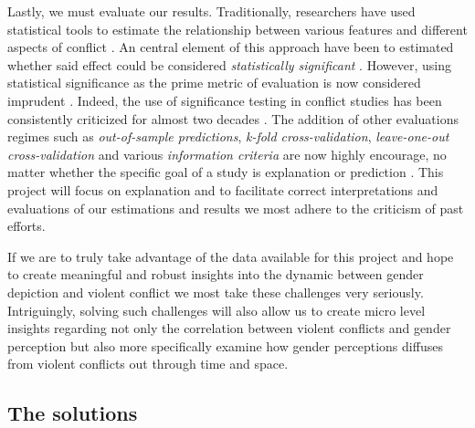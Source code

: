 \documentclass[a4paper]{article}
\begin{document}
Lastly, we must evaluate our results. Traditionally, researchers have used statistical tools to estimate the relationship between various features and different aspects of conflict \citep[8]{chadefaux2017conflict}. An central element of this approach have been to estimated whether said effect could be considered \emph{statistically significant} \citep[363-364]{Ward_Greenhill_Bakke_2010}. However, using statistical significance as the prime metric of evaluation is now considered imprudent \citep{Ward_Greenhill_Bakke_2010, Schrodt_2014, chadefaux2017conflict}. Indeed, the use of significance testing in conflict studies has been consistently criticized for almost two decades \citep{king_zeng_2001b, Ward_Greenhill_Bakke_2010, Goldstone_2010, Schrodt_2014, chadefaux2017conflict}. The addition of other evaluations regimes such as \emph{out-of-sample predictions}, \emph{k-fold cross-validation}, \emph{leave-one-out cross-validation} and various \emph{information criteria} are now highly encourage, no matter whether the specific goal of a study is explanation or prediction \citep{Ward_Greenhill_Bakke_2010, Schrodt_2014, Mcelreath_2018}. This project will focus on explanation and to facilitate correct interpretations and evaluations of our estimations and results we most adhere to the criticism of past efforts.\par 

If we are to truly take advantage of the data available for this project and hope to create meaningful and robust insights into the dynamic between gender depiction and violent conflict we most take these challenges very seriously. Intriguingly, solving such challenges will also allow us to create micro level insights regarding not only the correlation between violent conflicts and gender perception but also more specifically examine how gender perceptions diffuses from violent conflicts out through time and space.\par


\subsection{The solutions}
\end{document}

